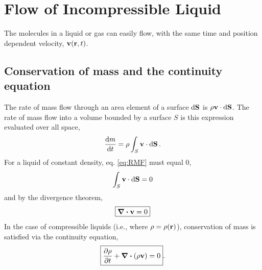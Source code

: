 \documentclass{book}
\begin{document}
\section{Flow of Incompressible Liquid}
The molecules in a liquid or gas can easily flow, with the same time and position dependent velocity, $\vb{v}(\vb{r},t)$.
\subsection{Conservation of mass and the continuity equation}
The rate of mass flow through an area element of a surface $\dd{\vb{S}}$ is $\rho\vb{v}\cdot\dd{\vb{S}}$. The rate of mass flow into a volume bounded by a surface $S$ is this expression evaluated over all space,
\begin{equation}
	\dv{m}{t} = \rho\int_S\vb{v}\cdot\dd{\vb{S}}. \label{eq:RMF}
\end{equation}
For a liquid of constant density, eq. \eqref{eq:RMF} must equal $0$,
\begin{equation}
	\int_S \vb{v}\cdot\dd{\vb{S}} = 0
\end{equation}
and by the divergence theorem,
\begin{equation}
	\boxed{\div{\vb{v}} = 0}
\end{equation}
In the case of compressible liquids (i.e., where $\rho = \rho(\vb{r})$), conservation of mass is satisfied via the continuity equation,
\begin{equation}
	\boxed{\pdv{\rho}{t} + \div{(\rho\vb{v})} = 0}.
\end{equation}
\end{document}
